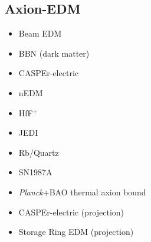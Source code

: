 \documentclass[9pt,twocolumn]{extarticle}
\begin{document}
\begin{mdframed}
\vspace{-1em}
\section{Axion-EDM}\vspace{-0.5em}
\begin{itemize}\setlength\itemsep{-0.5em}
	\item Beam EDM~\cite{Schulthess:2022pbp}
		\item BBN (dark matter)~\cite{Blum:2014vsa}
	\item CASPEr-electric~\cite{Aybas:2021nvn}
	\item nEDM~\cite{Abel:2017rtm}
	\item HfF$^+$~\cite{Roussy:2020ily}
	\item JEDI~\cite{JEDI:2022hxa}
	\item Rb/Quartz~\cite{Zhang:2022ewz}
	\item SN1987A~\cite{Graham:2013gfa}
	\item \emph{Planck}+BAO thermal axion bound~\cite{Caloni:2022uya}
	\item CASPEr-electric (projection)~\cite{JacksonKimball:2017elr}	
	\item Storage Ring EDM (projection)~\cite{JacksonKimball:2017elr}	
	
\end{itemize}
\end{mdframed}
\end{document}
